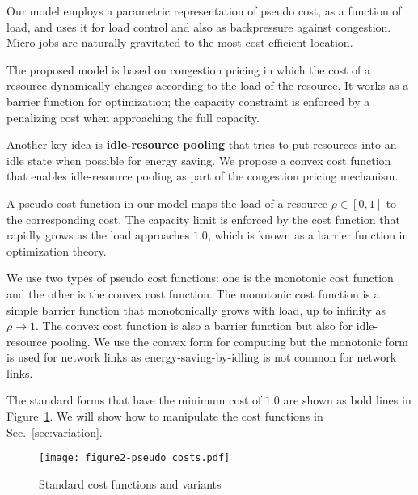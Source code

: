 
Our model employs a parametric representation of pseudo cost, as a
function of load, and uses it for load control and also as
backpressure against congestion.
Micro-jobs are naturally gravitated to the most cost-efficient
location.

The proposed model is based on congestion pricing in which the cost of
a resource dynamically changes according to the load of the resource.
It works as a barrier function for optimization; the capacity
constraint is enforced by a penalizing cost when approaching the full
capacity.

Another key idea is {\bf idle-resource pooling} that tries to put resources
into an idle state when possible for energy saving.
We propose a convex cost function that enables idle-resource pooling
as part of the congestion pricing mechanism.

A pseudo cost function in our model maps the load of a resource
$\rho \in [0, 1]$ to the corresponding cost.
The capacity limit is enforced by the cost function that rapidly grows
as the load approaches $1.0$, which is known as a barrier function in
optimization theory.

We use two types of pseudo cost functions: one is the monotonic cost
function and the other is the convex cost function.
The monotonic cost function is a simple barrier function that
monotonically grows with load, up to infinity as $\rho \to 1$.
The convex cost function is also a barrier function but also for
idle-resource pooling.
We use the convex form for computing but the monotonic form
is used for network links as energy-saving-by-idling is not common for
network links.

The standard forms that have the minimum cost of $1.0$ are
shown as bold lines in Figure~\ref{fig:std_costfunc}. We will show how
to manipulate the cost functions in Sec.~\ref{sec:variation}.

\begin{figure}[tb]
  \begin{center}
    \texttt{[image: figure2-pseudo\_costs.pdf]}
    \vspace{-2.0ex}
    \caption{Standard cost functions and variants}
    \label{fig:std_costfunc}
  \end{center}
\end{figure}

